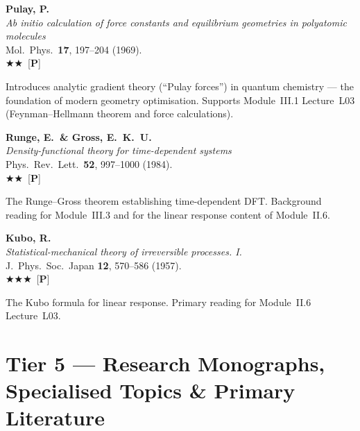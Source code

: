 \documentclass[11pt,a4paper]{article}
\newcommand{\essential}{$\bigstar\bigstar\bigstar$}
\newcommand{\recommended}{$\bigstar\bigstar$}
\newenvironment{bibentry}[1]{\begin{tcolorbox}[entrybox=#1,top=4pt,bottom=4pt]}{\end{tcolorbox}\smallskip}
\begin{document}
\begin{bibentry}{t4light}
\textbf{Pulay, P.}\\
\textit{Ab initio calculation of force constants and equilibrium geometries
in polyatomic molecules}\\
Mol.~Phys.~\textbf{17}, 197--204 (1969).\\[3pt]
\recommended\ [\textbf{P}]\\[3pt]
\begin{tcolorbox}[annotbox]
Introduces analytic gradient theory (``Pulay forces'') in quantum chemistry ---
the foundation of modern geometry optimisation. Supports Module~III.1 Lecture~L03
(Feynman--Hellmann theorem and force calculations).
\end{tcolorbox}
\end{bibentry}

\begin{bibentry}{t4light}
\textbf{Runge, E.\ \& Gross, E.~K.~U.}\\
\textit{Density-functional theory for time-dependent systems}\\
Phys.~Rev.~Lett.~\textbf{52}, 997--1000 (1984).\\[3pt]
\recommended\ [\textbf{P}]\\[3pt]
\begin{tcolorbox}[annotbox]
The Runge--Gross theorem establishing time-dependent DFT. Background reading for
Module~III.3 and for the linear response content of Module~II.6.
\end{tcolorbox}
\end{bibentry}

\begin{bibentry}{t4light}
\textbf{Kubo, R.}\\
\textit{Statistical-mechanical theory of irreversible processes. I.}\\
J.~Phys.~Soc.~Japan \textbf{12}, 570--586 (1957).\\[3pt]
\essential\ [\textbf{P}]\\[3pt]
\begin{tcolorbox}[annotbox]
The Kubo formula for linear response. Primary reading for Module~II.6 Lecture~L03.
\end{tcolorbox}
\end{bibentry}

\newpage
\section{Tier 5 --- Research Monographs, Specialised Topics \& Primary Literature}
\label{sec:t5}
\end{document}
